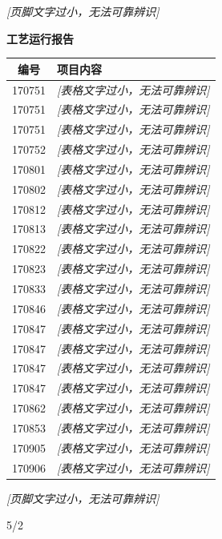 \documentclass[UTF8,10pt,a4paper,fontset=fandol]{ctexart}
\newcommand{\handwritten}[1]{#1}
\begin{document}
\begin{center}
\begin{minipage}[t]{0.47\textwidth}
\vspace{2mm}
\textit{[页脚文字过小，无法可靠辨识]}
\end{minipage}
\hfill
\begin{minipage}[t]{0.47\textwidth}
\centering
\textbf{工艺运行报告}

\small
\begin{tabularx}{\textwidth}{|c|X|}
\hline
\textbf{编号} & \textbf{项目内容} \\ \hline
170751 & \textit{[表格文字过小，无法可靠辨识]} \\ \hline
170751 & \textit{[表格文字过小，无法可靠辨识]} \\ \hline
170751 & \textit{[表格文字过小，无法可靠辨识]} \\ \hline
170752 & \textit{[表格文字过小，无法可靠辨识]} \\ \hline
170801 & \textit{[表格文字过小，无法可靠辨识]} \\ \hline
170802 & \textit{[表格文字过小，无法可靠辨识]} \\ \hline
170812 & \textit{[表格文字过小，无法可靠辨识]} \\ \hline
170813 & \textit{[表格文字过小，无法可靠辨识]} \\ \hline
170822 & \textit{[表格文字过小，无法可靠辨识]} \\ \hline
170823 & \textit{[表格文字过小，无法可靠辨识]} \\ \hline
170833 & \textit{[表格文字过小，无法可靠辨识]} \\ \hline
170846 & \textit{[表格文字过小，无法可靠辨识]} \\ \hline
170847 & \textit{[表格文字过小，无法可靠辨识]} \\ \hline
170847 & \textit{[表格文字过小，无法可靠辨识]} \\ \hline
170847 & \textit{[表格文字过小，无法可靠辨识]} \\ \hline
170847 & \textit{[表格文字过小，无法可靠辨识]} \\ \hline
170862 & \textit{[表格文字过小，无法可靠辨识]} \\ \hline
170853 & \textit{[表格文字过小，无法可靠辨识]} \\ \hline
170905 & \textit{[表格文字过小，无法可靠辨识]} \\ \hline
170906 & \textit{[表格文字过小，无法可靠辨识]} \\ \hline
\end{tabularx}

\vspace{2mm}
\textit{[页脚文字过小，无法可靠辨识]}
\end{minipage}

\vspace{4mm}

\handwritten{5/2}

\end{center}
\end{document}
